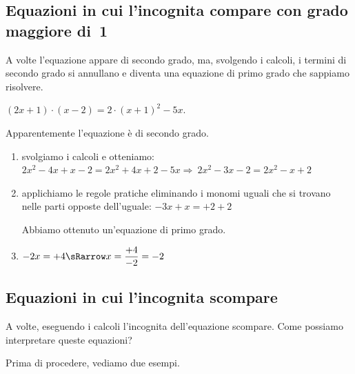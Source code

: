 
\subsection{Equazioni in cui l'incognita compare con grado maggiore di~1}
A volte l'equazione appare di secondo grado, ma, svolgendo i calcoli, 
i termini di secondo grado si annullano e diventa una equazione di primo 
grado che sappiamo risolvere.

\begin{esempio}{}{}

\((2x+1)\cdot (x-2)=2\cdot (x+1)^{2}-5x\).

\vspace{.5em}
Apparentemente l'equazione è di secondo grado. 

\begin{enumerate}
\item svolgiamo i calcoli e otteniamo:\\[1mm]
\(2x^{2}-4x+x-2=2x^{2}+4x+2-5x\Rightarrow~2x^{2}-3x-2=2x^{2}-x+2\)
\item applichiamo le regole pratiche eliminando i monomi
uguali che si trovano nelle parti opposte dell'uguale:
\(-3x+x=+2+2\)

Abbiamo ottenuto un'equazione di primo grado.
\item \(-2x = +4 \sRarrow x = \dfrac{+4}{-2} = -2\)
\end{enumerate}

\end{esempio}


\subsection{Equazioni in cui l'incognita scompare}
 

A volte, eseguendo i calcoli l'incognita dell'equazione scompare. 
Come possiamo interpretare queste equazioni?

Prima di procedere, vediamo due esempi.

